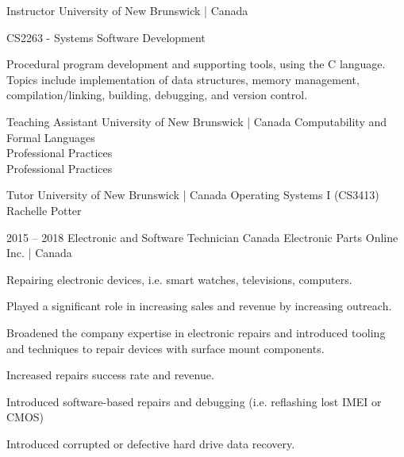 \documentclass{developercv} %
\begin{document}
\begin{entrylist}
	{Instructor}
	{University of New Brunswick | Canada}{
	\textbullet{} CS2263 - Systems Software Development
	\begin{quoting}
		Procedural program development and supporting tools, using the C language.
		Topics include implementation of data structures, memory management, compilation/linking, building, debugging, and version control.
	\end{quoting}
	}

	{Teaching Assistant}
	{University of New Brunswick | Canada}
	{
	\textbullet{} Computability and Formal Languages\\
	\textbullet{} Professional Practices\\
	\textbullet{} Professional Practices\\
	}

	{Tutor}
	{University of New Brunswick | Canada}{
	\textbullet{} Operating Systems I (CS3413) Rachelle Potter
	}

	\entry
	{2015 -- 2018}
	{Electronic and Software Technician}
	{Canada Electronic Parts Online Inc. | Canada}{
		Repairing electronic devices, i.e. smart watches, televisions, computers.
		\begin{tightemize}
			\item Played a significant role in increasing sales and revenue by increasing outreach.
			\item Broadened the company expertise in electronic repairs and introduced tooling and techniques to repair devices with surface mount components.
			\item Increased repairs success rate and revenue.
			\item Introduced software-based repairs and debugging (i.e. reflashing lost IMEI or CMOS)
			\item Introduced corrupted or defective hard drive data recovery.
		\end{tightemize}
	}

\end{entrylist}
\end{document}
